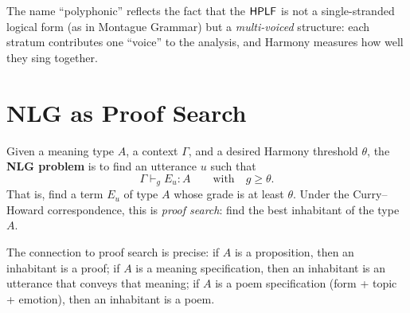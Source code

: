 \begin{remark}[Polyphony]
The name ``polyphonic'' reflects the fact that the $\mathsf{HPLF}$ is not a
single-stranded logical form (as in Montague Grammar) but a
\emph{multi-voiced} structure: each stratum contributes one ``voice''
to the analysis, and Harmony measures how well they sing together.
\end{remark}

\section{NLG as Proof Search}
\label{sec:nlg}

\begin{definition}
\label{def:nlg-problem}
Given a meaning type $A$, a context $\Gamma$, and a desired Harmony
threshold $\theta$, the \textbf{NLG problem} is to find an utterance
$u$ such that
\[
  \Gamma \vdash_g E_u : A
  \qquad\text{with}\quad
  g \geq \theta.
\]
That is, find a term $E_u$ of type $A$ whose grade is at least
$\theta$.  Under the Curry--Howard correspondence, this is
\emph{proof search}: find the best inhabitant of the type $A$.
\end{definition}

The connection to proof search is precise: if $A$ is a proposition,
then an inhabitant is a proof; if $A$ is a meaning specification,
then an inhabitant is an utterance that conveys that meaning; if $A$
is a poem specification (form + topic + emotion), then an inhabitant
is a poem.


